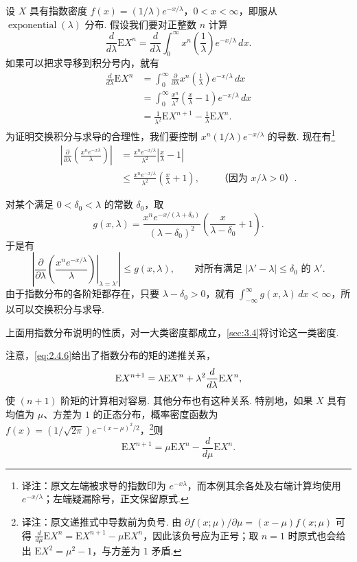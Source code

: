 \begin{example}[交换积分与求导——I]\label{ex:2.4.5}
设 $X$ 具有指数密度 $f(x)=(1/\lambda)e^{-x/\lambda}$，$0<x<\infty$，即服从 $\operatorname{exponential}(\lambda)$ 分布. 假设我们要对正整数 $n$ 计算
\begin{equation}\label{eq:2.4.5}
\frac d{d\lambda}\mathrm EX^n=\frac d{d\lambda}\int_0^\infty x^n\left(\frac1\lambda\right)e^{-x/\lambda}\,dx.
\end{equation}
如果可以把求导移到积分号内，就有
\begin{equation}\label{eq:2.4.6}
\begin{aligned}
\frac d{d\lambda}\mathrm EX^n&=\int_0^\infty\frac\partial{\partial\lambda}x^n\left(\frac1\lambda\right)e^{-x/\lambda}\,dx\\
&=\int_0^\infty\frac{x^n}{\lambda^2}\left(\frac x\lambda-1\right)e^{-x/\lambda}\,dx\\
&=\frac1{\lambda^2}\mathrm EX^{n+1}-\frac1\lambda\mathrm EX^n.
\end{aligned}
\end{equation}
为证明交换积分与求导的合理性，我们要控制 $x^n(1/\lambda)e^{-x/\lambda}$ 的导数. 现在有\footnote{译注：原文左端被求导的指数印为 $e^{-x\lambda}$，而本例其余各处及右端计算均使用 $e^{-x/\lambda}$；左端疑漏除号，正文保留原式.}
$$\begin{aligned}
\left|\frac\partial{\partial\lambda}\left(\frac{x^ne^{-x\lambda}}\lambda\right)\right|
&=\frac{x^ne^{-x/\lambda}}{\lambda^2}\left|\frac x\lambda-1\right|\\
&\le\frac{x^ne^{-x/\lambda}}{\lambda^2}\left(\frac x\lambda+1\right),\qquad\text{（因为 $x/\lambda>0$）}.
\end{aligned}$$

对某个满足 $0<\delta_0<\lambda$ 的常数 $\delta_0$，取
$$g(x,\lambda)=\frac{x^ne^{-x/(\lambda+\delta_0)}}{(\lambda-\delta_0)^2}
\left(\frac{x}{\lambda-\delta_0}+1\right).$$
于是有
$$\left|\left.\frac\partial{\partial\lambda}\left(\frac{x^ne^{-x/\lambda}}\lambda\right)\right|_{\lambda=\lambda'}\right|
\le g(x,\lambda),\qquad\text{对所有满足 $|\lambda'-\lambda|\le\delta_0$ 的 $\lambda'$}.$$
由于指数分布的各阶矩都存在，只要 $\lambda-\delta_0>0$，就有 $\int_{-\infty}^\infty g(x,\lambda)\,dx<\infty$，所以可以交换积分与求导.
\end{example}
上面用指数分布说明的性质，对一大类密度都成立，\autoref{sec:3.4}将讨论这一类密度.

注意，\eqref{eq:2.4.6}给出了指数分布的矩的递推关系，
\begin{equation}\label{eq:2.4.7}\index{SI0294@递推关系}
\mathrm EX^{n+1}=\lambda\mathrm EX^n+\lambda^2\frac d{d\lambda}\mathrm EX^n,
\end{equation}
使 $(n+1)$ 阶矩的计算相对容易. 其他分布也有这种关系. 特别地，如果 $X$ 具有均值为 $\mu$、方差为 $1$ 的正态分布，概率密度函数为 $f(x)=(1/\sqrt{2\pi})e^{-(x-\mu)^2/2}$，\footnote{译注：原文递推式中导数前为负号. 由 $\partial f(x;\mu)/\partial\mu=(x-\mu)f(x;\mu)$ 可得 $\frac d{d\mu}\mathrm EX^n=\mathrm EX^{n+1}-\mu\mathrm EX^n$，因此该负号应为正号；取 $n=1$ 时原式也会给出 $\mathrm EX^2=\mu^2-1$，与方差为 $1$ 矛盾.}则
$$\mathrm EX^{n+1}=\mu\mathrm EX^n-\frac d{d\mu}\mathrm EX^n.$$


